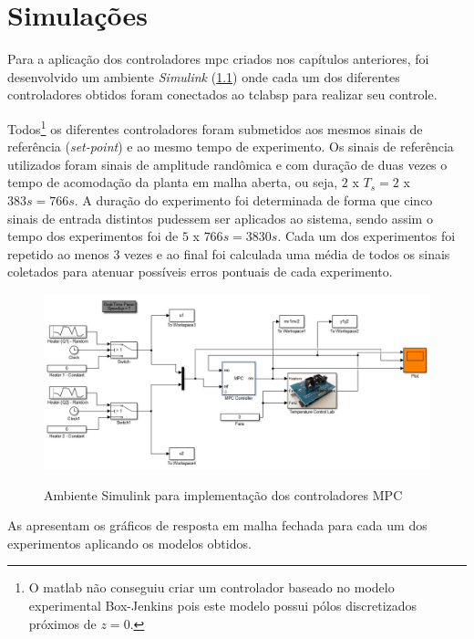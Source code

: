 \chapter{Simulações}
\label{ch:simulacoes}

Para a aplicação dos controladores \acrshort{mpc} criados nos capítulos anteriores, foi desenvolvido um
ambiente \textit{Simulink} (\cref{fig:simulinkusingmpc}) onde cada um dos diferentes controladores obtidos
foram conectados ao \acrshort{tclabsp} para realizar seu controle.

Todos\footnote{
    O \acrshort{matlab} não conseguiu criar um controlador baseado no modelo experimental Box-Jenkins
    pois este modelo possui pólos discretizados próximos de $z=0$.
}  os diferentes controladores foram submetidos aos mesmos sinais de referência (\textit{set-point})
e ao mesmo tempo de experimento. Os sinais de referência utilizados foram sinais de amplitude randômica
e com duração de duas vezes o tempo de acomodação da planta em malha aberta, ou seja, $2$ x $T_s = 2$ x $383s = 766s$.
A duração do experimento foi determinada de forma que cinco sinais de entrada distintos pudessem ser
aplicados ao sistema, sendo assim o tempo dos experimentos foi de $5$ x $766s = 3830s$.
Cada um dos experimentos foi repetido ao menos 3 vezes e ao final foi calculada uma média de todos os 
sinais coletados para atenuar possíveis erros pontuais de cada experimento.

\begin{figure}[!h]
	\caption{Ambiente Simulink para implementação dos controladores MPC}
	\begin{center}
		\includegraphics[width=1.00\textwidth]{./5_images/SimulinkUsingMPC.png} 
		\label{fig:simulinkusingmpc}
	\end{center}
	\centering
\end{figure}

As  apresentam os gráficos de resposta em malha fechada
para cada um dos experimentos aplicando os modelos obtidos.

